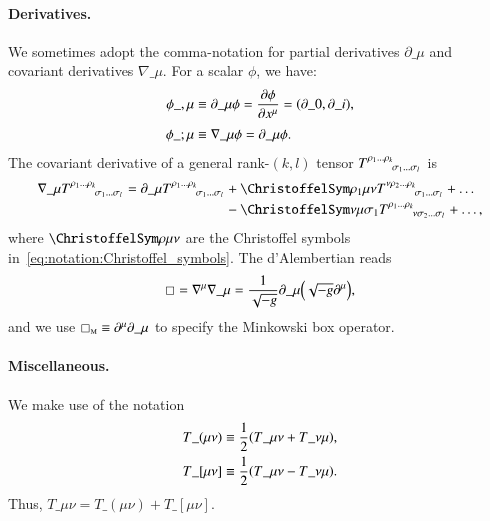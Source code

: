 \paragraph{Derivatives.} 
We sometimes adopt the comma-notation for partial derivatives $\partial\_\mu$ and covariant derivatives $\nabla\_\mu$. For a scalar $\phi$, we have:
\begin{subequations}\label{eq:notation:comma_notation_darivatives}
    \begin{align}
        \phi\_{,\mu} &\equiv \partial\_\mu \phi = \pdv{\phi}{x\^\mu} =\pclosed{\partial\_0, \partial\_i }, \\
        \phi\_{;\mu} &\equiv \nabla\_\mu \phi = \partial\_\mu \phi . 
    \end{align}
\end{subequations}
The covariant derivative of a general rank-$(k,l)$ tensor $T\iud{\rho_1 \dots \rho_k}{\sigma_1 \dots \sigma_l}$ is
\begin{equation}\label{eq:notation:covariant_derivative_rank_kl}
    \begin{split}
        \nabla\_\mu T\iud{\rho_1 \dots \rho_k}{\sigma_1 \dots \sigma_l} = \partial\_\mu T\iud{\rho_1 \dots \rho_k}{\sigma_1 \dots \sigma_l} &+ \Chr{\rho_1}{\mu\nu} T\iud{\nu \rho_2 \dots \rho_k}{\sigma_1 \dots \sigma_l} + \dots \\
        &- \Chr{\nu}{\mu\sigma_1} T\iud{\rho_1 \dots \rho_k}{\nu\sigma_2 \dots \sigma_l} + \dots,
    \end{split}
\end{equation}
where $\Chr{\rho}{\mu\nu}$ are the Christoffel symbols in~\cref{eq:notation:Christoffel_symbols}.
The d'Alembertian reads
\begin{equation}\label{eq:notation:dAlembertian}
    \sq   = \nabla\^\mu \nabla\_\mu  = \frac{1}{\sqrt{-g}} \partial\_\mu \pclosed{ \sqrt{-g} \partial\^\mu},
\end{equation}
and we use $\sq\nped{M} \equiv \partial\^\mu\partial\_\mu$ to specify the Minkowski box operator.


\paragraph{Miscellaneous.} %
We make use of the notation
\begin{subequations}\label{eq:notation:sym_and_antisym_tensor_notation}
    \begin{align}
        T\_{(\mu\nu)} &\equiv \frac{1}{2} {\left(  T\_{\mu\nu} + T\_{\nu\mu}   \right)}, \\
        T\_{[\mu\nu]} &\equiv \frac{1}{2} {\left(  T\_{\mu\nu} - T\_{\nu\mu}   \right)}.
    \end{align} 
\end{subequations}
Thus, $T\_{\mu\nu}= T\_{(\mu\nu)} + T\_{[\mu\nu]}$. %



